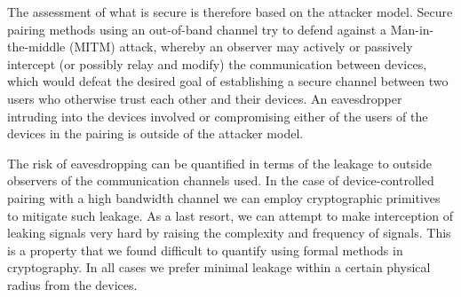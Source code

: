 \documentclass[conference, 11pt]{sty/IEEEtran}
\begin{document}
The assessment of what is secure is therefore based on the attacker model.
Secure pairing methods using an out-of-band channel try to defend against a Man-in-the-middle (MITM) attack, whereby an observer may actively or passively intercept (or possibly relay and modify) the communication between devices, which would defeat the desired goal of establishing a secure channel between two users who otherwise trust each other and their devices.
An eavesdropper intruding into the devices involved or compromising either of the users of the devices in the pairing is outside of the attacker model.

The risk of eavesdropping can be quantified in terms of the leakage to outside observers of the communication channels used.
In the case of device-controlled pairing with a high bandwidth channel we can employ cryptographic primitives to mitigate such leakage.
As a last resort, we can attempt to make interception of leaking signals very hard by raising the complexity and frequency of signals.
This is a property that we found difficult to quantify using formal methods in cryptography.
In all cases we prefer minimal leakage within a certain physical radius from the devices.
\end{document}
